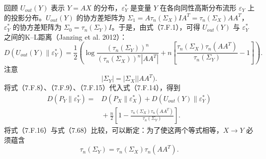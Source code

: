 回顾 $U_{out}(Y)$ 表示 $Y=AX$ 的分布，$\varepsilon_Y^*$ 是变量 $Y$ 在各向同性高斯分布流形 $\varepsilon_Y$ 上的投影分布。$U_{out}(Y)$ 的协方差矩阵为 $\Sigma_1=A\tau_n(\Sigma_X)IA^T=\tau_n(\Sigma_X)AA^T$，$\varepsilon_Y^*$ 的协方差矩阵为 $\Sigma_0=\tau_n(\Sigma_Y)I$。于是，由式（7.F.1），可得 $U_{out}(Y)$ 与 $\varepsilon_Y^*$ 之间的K–L距离（Janzing et al. 2012）：
\begin{equation}
D(U_{out}(Y)\parallel\varepsilon_Y^*)
 =\frac12\left(\log\frac{(\tau_n(\Sigma_Y))^n}
 {(\tau_n(\Sigma_X))^n|AA^T|}
 +n\left[\frac{\tau_n(\Sigma_X)\tau_n(AA^T)}{\tau_n(\Sigma_Y)}-1\right]\right).\tag{7.F.14}
\end{equation}
注意
\begin{equation}
|\Sigma_Y|=|\Sigma_X||AA^T).\tag{7.F.15}
\end{equation}
将式（7.F.8）、（7.F.9）、（7.F.15）代入式（7.F.14），得到
\begin{equation}
\begin{aligned}
D(P_Y\parallel\varepsilon_Y^*)
={}&D(P_X\parallel\varepsilon_X^*)+D(U_{out}(Y)\parallel\varepsilon_Y^*)\\
&{}+\frac n2\left[1-\frac{\tau_n(\Sigma_X)\tau_n(AA^T)}{\tau_n(\Sigma_Y)}\right].
\end{aligned}\tag{7.F.16}
\end{equation}
将式（7.F.16）与式（7.68）比较，可以断定：为了使这两个等式相等，$X\to Y$ 必须蕴含
\begin{equation}
\tau_n(\Sigma_Y)=\tau_n(\Sigma_X)\tau_n(AA^T).\tag{7.F.17}
\end{equation}
